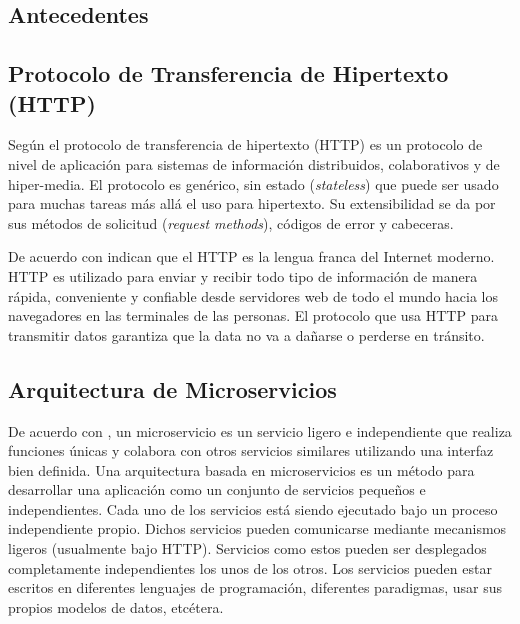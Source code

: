 
\subsection{Antecedentes}

%
%
%


\subsection{Protocolo de Transferencia de Hipertexto (HTTP)}

Según \cite{goralski2017illustrated} el protocolo de transferencia de hipertexto (HTTP) es un protocolo de nivel de aplicación para sistemas de información
distribuidos, colaborativos y de hiper-media.
El protocolo es genérico, sin estado ({\it stateless}) que puede ser usado para muchas tareas más allá el uso para hipertexto.
Su extensibilidad se da por sus métodos de solicitud ({\it request methods}), códigos de error y cabeceras.

De acuerdo con \cite{gourley2002http} indican que el HTTP es la lengua franca del Internet moderno.
HTTP es utilizado para enviar y recibir todo tipo de información de manera rápida, conveniente y confiable
desde servidores web de todo el mundo hacia los navegadores en las terminales de las personas.
El protocolo que usa HTTP para transmitir datos garantiza que la data no va a dañarse o perderse en
tránsito.


\subsection{Arquitectura de Microservicios}

De acuerdo con \cite{dmitry2014micro}, un microservicio es un servicio ligero e independiente que
realiza funciones únicas y colabora con otros servicios similares utilizando una interfaz bien definida.
Una arquitectura basada en microservicios es un método para desarrollar una aplicación como un conjunto
de servicios pequeños e independientes. Cada uno de los servicios está siendo ejecutado bajo un
proceso independiente propio. Dichos servicios pueden comunicarse mediante mecanismos ligeros (usualmente
bajo HTTP). Servicios como estos pueden ser desplegados completamente independientes los unos de los otros.
Los servicios pueden estar escritos en diferentes lenguajes de programación, diferentes paradigmas,
usar sus propios modelos de datos, etcétera.

